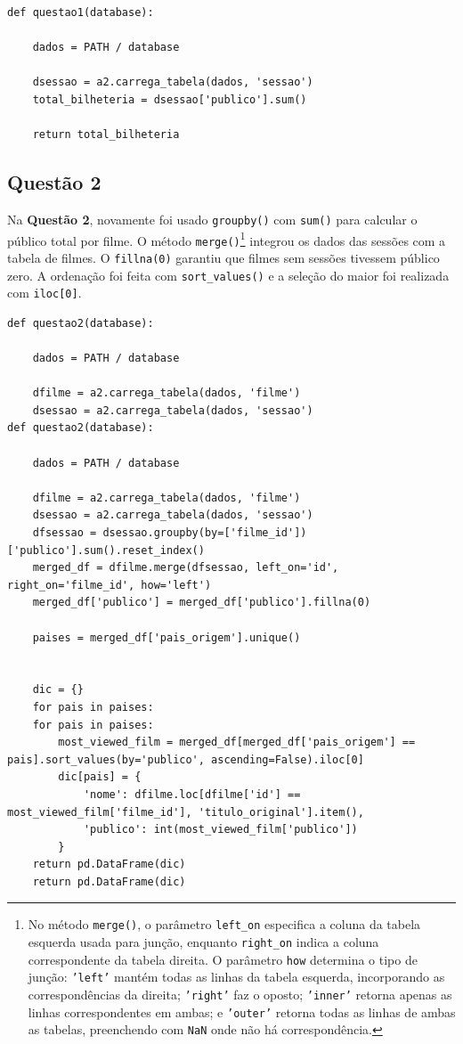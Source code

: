 \documentclass{article}
\begin{document}
\linespread{1}
\begin{lstlisting}
def questao1(database):
    
    dados = PATH / database

    dsessao = a2.carrega_tabela(dados, 'sessao')
    total_bilheteria = dsessao['publico'].sum()

    return total_bilheteria

\end{lstlisting}
\linespread{1.5}
\subsection*{Questão 2}
Na \textbf{Questão 2}, novamente foi usado \texttt{groupby()} com \texttt{sum()} para calcular o público total por filme. O método \texttt{merge()}\footnote{No método \texttt{merge()}, o parâmetro \texttt{left\_on} especifica a coluna da tabela esquerda usada para junção, enquanto \texttt{right\_on} indica a coluna correspondente da tabela direita. O parâmetro \texttt{how} determina o tipo de junção: \texttt{'left'} mantém todas as linhas da tabela esquerda, incorporando as correspondências da direita; \texttt{'right'} faz o oposto; \texttt{'inner'} retorna apenas as linhas correspondentes em ambas; e \texttt{'outer'} retorna todas as linhas de ambas as tabelas, preenchendo com \texttt{NaN} onde não há correspondência.} integrou os dados das sessões com a tabela de filmes. O \texttt{fillna(0)} garantiu que filmes sem sessões tivessem público zero. A ordenação foi feita com \texttt{sort\_values()} e a seleção do maior foi realizada com \texttt{iloc[0]}.
\linespread{1}
\begin{lstlisting}
def questao2(database):

    dados = PATH / database

    dfilme = a2.carrega_tabela(dados, 'filme')
    dsessao = a2.carrega_tabela(dados, 'sessao')
def questao2(database):

    dados = PATH / database

    dfilme = a2.carrega_tabela(dados, 'filme')
    dsessao = a2.carrega_tabela(dados, 'sessao')
    dfsessao = dsessao.groupby(by=['filme_id'])['publico'].sum().reset_index()
    merged_df = dfilme.merge(dfsessao, left_on='id', right_on='filme_id', how='left')
    merged_df['publico'] = merged_df['publico'].fillna(0)
    
    paises = merged_df['pais_origem'].unique()
    
    
    dic = {}
    for pais in paises:        
    for pais in paises:        
        most_viewed_film = merged_df[merged_df['pais_origem'] == pais].sort_values(by='publico', ascending=False).iloc[0]
        dic[pais] = {
            'nome': dfilme.loc[dfilme['id'] == most_viewed_film['filme_id'], 'titulo_original'].item(),
            'publico': int(most_viewed_film['publico'])
        }
    return pd.DataFrame(dic) 
    return pd.DataFrame(dic) 
\end{lstlisting}
\end{document}

